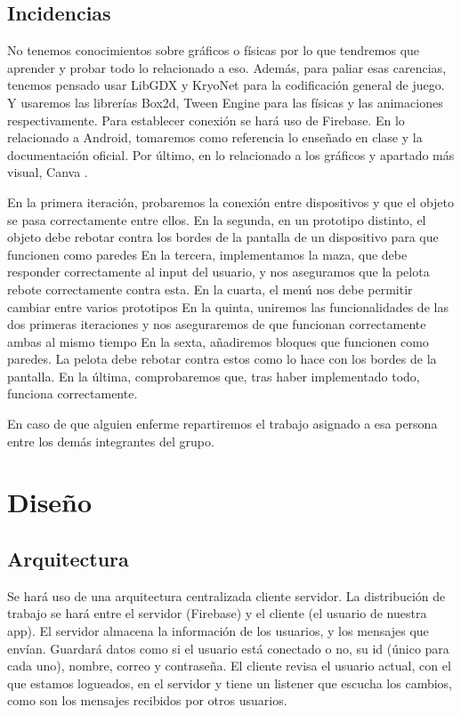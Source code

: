 \documentclass[a4paper,openright,12pt]{article}
\begin{document}
\subsection{Incidencias}
No tenemos conocimientos sobre gráficos o físicas por lo que tendremos que aprender y probar todo lo relacionado a eso. Además, para paliar esas carencias, tenemos pensado usar LibGDX\cite{misc-libGDX} y KryoNet\cite{misc-kryonet} para la codificación general de juego. Y usaremos las librerías Box2d\cite{misc-box2d}, Tween Engine\cite{misc-tween} para las físicas y las animaciones respectivamente. Para establecer conexión se hará uso de Firebase\cite{misc-firebase}. En lo relacionado a Android, tomaremos como referencia lo enseñado en clase y la documentación oficial\cite{misc-android-developers}. Por último, en lo relacionado a los gráficos y apartado más visual, Canva \cite{misc-canva}.
\par
En la primera iteración, probaremos la conexión entre dispositivos y que el objeto se pasa correctamente entre ellos.
En la segunda, en un prototipo distinto, el objeto debe rebotar contra los bordes de la pantalla de un dispositivo para que funcionen como paredes
En la tercera, implementamos la maza, que debe responder correctamente al input del usuario, y nos aseguramos que la pelota rebote correctamente contra esta.
En la cuarta, el menú nos debe permitir cambiar entre varios prototipos
En la quinta, uniremos las funcionalidades de las dos primeras iteraciones y nos aseguraremos de que funcionan correctamente ambas al mismo tiempo
En la sexta, añadiremos bloques que funcionen como paredes. La pelota debe rebotar contra estos como lo hace con los bordes de la pantalla.
En la última, comprobaremos que, tras haber implementado todo, funciona correctamente.
\par
En caso de que alguien enferme repartiremos el trabajo asignado a esa persona entre los demás integrantes del grupo.

\section{Diseño}
\subsection{Arquitectura}
Se hará uso de una arquitectura centralizada cliente servidor. La distribución de trabajo se hará entre el servidor (Firebase) y el cliente (el usuario de nuestra app). El servidor almacena la información de los usuarios, y los mensajes que envían. Guardará datos como si el usuario está conectado o no, su id (único para cada uno), nombre, correo y contraseña. El cliente revisa el usuario actual, con el que estamos logueados, en el servidor y tiene un listener que escucha los cambios, como son los mensajes recibidos por otros usuarios.
\end{document}
